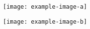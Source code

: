 \documentclass{report}
\begin{document}
\begin{figure}[p]
  \texttt{[image: example-image-a]}
\end{figure}
\clearpage
\par
\begin{figure}[p]
  \texttt{[image: example-image-b]}
\end{figure}
\end{document}
